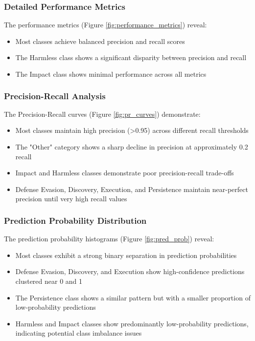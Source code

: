         \subsubsection{Detailed Performance Metrics}

            The performance metrics (Figure \ref{fig:performance_metrics}) reveal:

            \begin{itemize}
                \item Most classes achieve balanced precision and recall scores
                \item The Harmless class shows a significant disparity between precision and recall
                \item The Impact class shows minimal performance across all metrics
            \end{itemize}

        \subsubsection{Precision-Recall Analysis}

            The Precision-Recall curves (Figure \ref{fig:pr_curves}) demonstrate:

            \begin{itemize}
                \item Most classes maintain high precision (>0.95) across different recall thresholds
                \item The "Other" category shows a sharp decline in precision at approximately 0.2 recall
                \item Impact and Harmless classes demonstrate poor precision-recall trade-offs
                \item Defense Evasion, Discovery, Execution, and Persistence maintain near-perfect precision until very high recall values
            \end{itemize}

        \subsubsection{Prediction Probability Distribution}

            The prediction probability histograms (Figure \ref{fig:pred_prob}) reveal:

            \begin{itemize}
                \item Most classes exhibit a strong binary separation in prediction probabilities
                \item Defense Evasion, Discovery, and Execution show high-confidence predictions clustered near 0 and 1
                \item The Persistence class shows a similar pattern but with a smaller proportion of low-probability predictions
                \item Harmless and Impact classes show predominantly low-probability predictions, indicating potential class imbalance issues
            \end{itemize}
            
